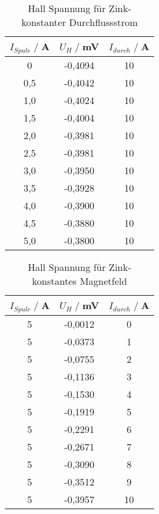 \begin{table}
    \centering
    \begin{tabular}{c c c}
        \toprule
        $I_{Spule} \;/\;$A & $U_H\;/\;$mV & $I_{durch} \;/\;$A\\
        \midrule
            0                   &-0,4094&             10\\
            0,5                 &-0,4042&             10\\
            1,0                 &-0,4024&             10\\
            1,5                 &-0,4004&             10\\
            2,0                 &-0,3981&             10\\
            2,5                 &-0,3981&             10\\
            3,0                 &-0,3950&             10\\
            3,5                 &-0,3928&             10\\
            4,0                 &-0,3900&             10\\
            4,5                 &-0,3880&             10\\
            5,0                 &-0,3800&             10\\
        \bottomrule
    \end{tabular}
    \caption{Hall Spannung für Zink- konstanter Durchflussstrom}
    \label{tab:Zn_I}
\end{table}

\begin{table}
    \centering
    \begin{tabular}{c c c}
        \toprule
        $I_{Spule} \;/\;$A & $U_H\;/\;$mV & $I_{durch} \;/\;$A\\
        \midrule
            5                   &-0,0012&             0\\
            5                   &-0,0373&             1\\
            5                   &-0,0755&             2\\
            5                   &-0,1136&             3\\
            5                   &-0,1530&             4\\
            5                   &-0,1919&             5\\
            5                   &-0,2291&             6\\
            5                   &-0,2671&             7\\
            5                   &-0,3090&             8\\
            5                   &-0,3512&             9\\
            5                   &-0,3957&             10\\
        \bottomrule
    \end{tabular}
    \caption{Hall Spannung für Zink- konstantes Magnetfeld}
    \label{tab:Zn_B}
\end{table}

